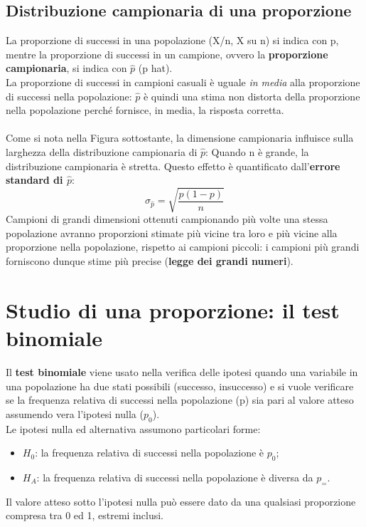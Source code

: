 \documentclass[drafts, 10pt]{book}
\begin{document}
\subsection{Distribuzione campionaria di una proporzione}
La proporzione di successi in una popolazione (X/n, X su n) si indica con p, mentre la proporzione di successi in un campione, ovvero la \textbf{proporzione campionaria}, si indica con $\hat{p}$ (p hat).
\\
La proporzione di successi in campioni casuali è uguale \textit{in media} alla proporzione di successi nella popolazione: $\hat{p}$ è quindi una stima non distorta della proporzione nella popolazione perché fornisce, in media, la risposta corretta.
\\
\\
Come si nota nella Figura sottostante, la dimensione campionaria influisce sulla larghezza della distribuzione campionaria di $\hat{p}$:
Quando n è grande, la distribuzione campionaria è stretta. Questo effetto è quantificato dall'\textbf{errore standard di $\hat{p}$}:
\begin{equation}
\sigma_{\hat{p}} = \sqrt{\frac{p(1-p)}{n}}
\end{equation}
\label{devstphat}
Campioni di grandi dimensioni ottenuti campionando più volte una stessa popolazione avranno proporzioni stimate più vicine tra loro e più vicine alla proporzione nella popolazione, rispetto ai campioni piccoli: i campioni più grandi forniscono dunque stime più precise (\textbf{legge dei grandi numeri}).

\section{Studio di una proporzione: il test binomiale}

Il \textbf{test binomiale} viene usato nella verifica delle ipotesi quando una variabile in una popolazione ha due stati possibili (successo, insuccesso) e si vuole verificare se la frequenza relativa di successi nella popolazione (p) sia pari al valore atteso assumendo vera l'ipotesi nulla ($p_0$).
\\
Le ipotesi nulla ed alternativa assumono particolari forme:
\begin{itemize}
\item $H_0$: la frequenza relativa di successi nella popolazione è $p_0$;
\item $H_A$: la frequenza relativa di successi nella popolazione è diversa da $p_=$.
\end{itemize}
Il valore atteso sotto l'ipotesi nulla può essere dato da una qualsiasi proporzione compresa tra 0 ed 1, estremi inclusi.
\end{document}
